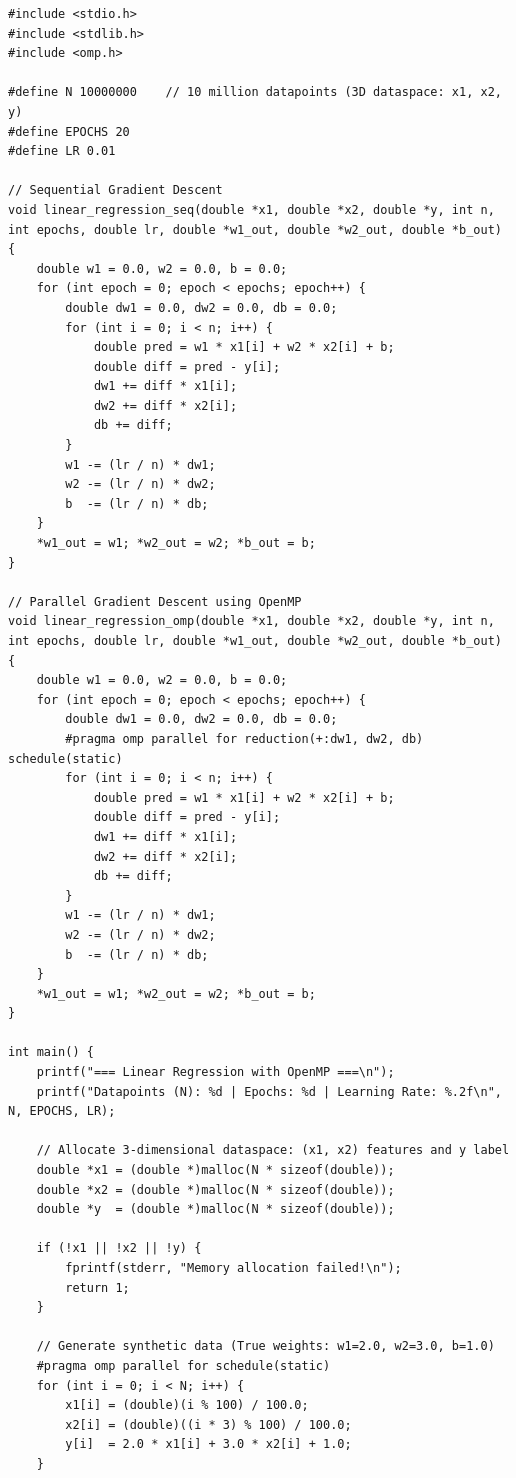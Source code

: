 \documentclass[12pt]{article}
\begin{document}
\begin{lstlisting}[style=code]
#include <stdio.h>
#include <stdlib.h>
#include <omp.h>

#define N 10000000    // 10 million datapoints (3D dataspace: x1, x2, y)
#define EPOCHS 20
#define LR 0.01

// Sequential Gradient Descent
void linear_regression_seq(double *x1, double *x2, double *y, int n, int epochs, double lr, double *w1_out, double *w2_out, double *b_out) {
    double w1 = 0.0, w2 = 0.0, b = 0.0;
    for (int epoch = 0; epoch < epochs; epoch++) {
        double dw1 = 0.0, dw2 = 0.0, db = 0.0;
        for (int i = 0; i < n; i++) {
            double pred = w1 * x1[i] + w2 * x2[i] + b;
            double diff = pred - y[i];
            dw1 += diff * x1[i];
            dw2 += diff * x2[i];
            db += diff;
        }
        w1 -= (lr / n) * dw1;
        w2 -= (lr / n) * dw2;
        b  -= (lr / n) * db;
    }
    *w1_out = w1; *w2_out = w2; *b_out = b;
}

// Parallel Gradient Descent using OpenMP
void linear_regression_omp(double *x1, double *x2, double *y, int n, int epochs, double lr, double *w1_out, double *w2_out, double *b_out) {
    double w1 = 0.0, w2 = 0.0, b = 0.0;
    for (int epoch = 0; epoch < epochs; epoch++) {
        double dw1 = 0.0, dw2 = 0.0, db = 0.0;
        #pragma omp parallel for reduction(+:dw1, dw2, db) schedule(static)
        for (int i = 0; i < n; i++) {
            double pred = w1 * x1[i] + w2 * x2[i] + b;
            double diff = pred - y[i];
            dw1 += diff * x1[i];
            dw2 += diff * x2[i];
            db += diff;
        }
        w1 -= (lr / n) * dw1;
        w2 -= (lr / n) * dw2;
        b  -= (lr / n) * db;
    }
    *w1_out = w1; *w2_out = w2; *b_out = b;
}

int main() {
    printf("=== Linear Regression with OpenMP ===\n");
    printf("Datapoints (N): %d | Epochs: %d | Learning Rate: %.2f\n", N, EPOCHS, LR);

    // Allocate 3-dimensional dataspace: (x1, x2) features and y label
    double *x1 = (double *)malloc(N * sizeof(double));
    double *x2 = (double *)malloc(N * sizeof(double));
    double *y  = (double *)malloc(N * sizeof(double));

    if (!x1 || !x2 || !y) {
        fprintf(stderr, "Memory allocation failed!\n");
        return 1;
    }

    // Generate synthetic data (True weights: w1=2.0, w2=3.0, b=1.0)
    #pragma omp parallel for schedule(static)
    for (int i = 0; i < N; i++) {
        x1[i] = (double)(i % 100) / 100.0;
        x2[i] = (double)((i * 3) % 100) / 100.0;
        y[i]  = 2.0 * x1[i] + 3.0 * x2[i] + 1.0;
    }


\end{lstlisting}
\end{document}
